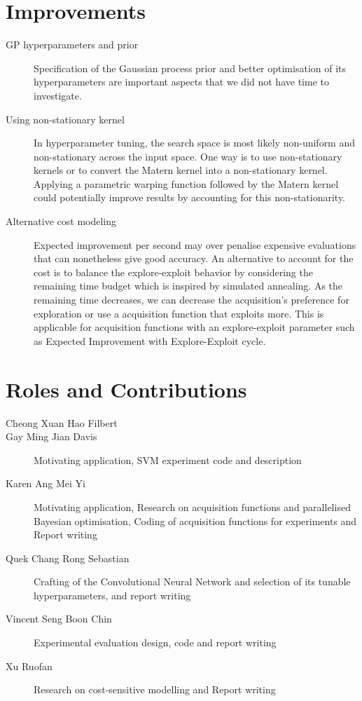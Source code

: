 \documentclass[letterpaper]{article}
\begin{document}
\section{Improvements}
\begin{description}
\item [GP hyperparameters and prior] Specification of the Gaussian process prior and better optimisation of its 
hyperparameters are important aspects that we did not have time to investigate.
\item [Using non-stationary kernel] In hyperparameter tuning, the search space is most likely non-uniform and 
non-stationary across the input space. One way is to use non-stationary
kernels or to convert the Matern kernel into a non-stationary kernel.
\cite{shahriari2016taking} Applying a parametric warping
function followed by the Matern kernel could potentially improve results by
accounting for this non-stationarity.
\item [Alternative cost modeling] Expected improvement per second may over penalise expensive evaluations that can nonetheless give good accuracy.
An alternative to account for the cost is to balance the explore-exploit behavior by considering the remaining time budget which is inspired by simulated annealing.
As the remaining time decreases, we can decrease the acquisition's preference for exploration or use a acquisition function that exploits more.
This is applicable for acquisition functions with an explore-exploit parameter such as Expected Improvement with Explore-Exploit cycle.
\end{description}

\section{Roles and Contributions}
\begin{description}
\item [Cheong Xuan Hao Filbert]
\item [Gay Ming Jian Davis] Motivating application, SVM experiment code and description
\item [Karen Ang Mei Yi] Motivating application, Research on acquisition functions
and parallelised Bayesian optimisation, Coding of acquisition functions for experiments and Report writing
\item [Quek Chang Rong Sebastian] Crafting of the Convolutional Neural Network and
selection of its tunable hyperparameters, and report writing
\item [Vincent Seng Boon Chin] Experimental evaluation design, code and report writing
\item [Xu Ruofan] Research on cost-sensitive modelling and Report writing
\end{description}



\end{document}
